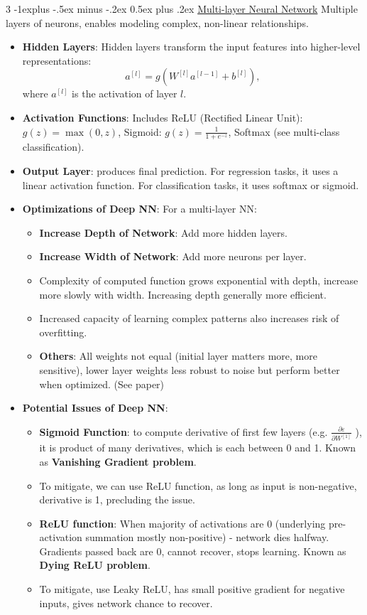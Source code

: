 \documentclass[a4paper, 9pt, landscape]{article}
\makeatletter
\renewcommand{\subsection}{\@startsection{subsection}{2}{0mm}%
                                {-1explus -.5ex minus -.2ex}%
                                {0.5ex plus .2ex}%
                                {\normalfont\normalsize\bfseries}}
\makeatother
\begin{document}
\begin{multicols*}{3}
\subsection{\underline{Multi-layer Neural Network}}
Multiple layers of neurons, enables modeling complex, non-linear relationships. 
\begin{itemize}
\item \textbf{Hidden Layers}: Hidden layers transform the input features into higher-level representations:
$$
a^{[l]} = g(W^{[l]} a^{[l-1]} + b^{[l]}),
$$
where $ a^{[l]} $ is the activation of layer $ l $.
\item \textbf{Activation Functions}: Includes ReLU (Rectified Linear Unit): $ g(z) = \max(0, z) $, Sigmoid: $ g(z) = \frac{1}{1 + e^{-z}} $, Softmax (see multi-class classification).
\item \textbf{Output Layer}: produces final prediction. For regression tasks, it uses a linear activation function. For classification tasks, it uses softmax or sigmoid.
\item \textbf{Optimizations of Deep NN}: For a multi-layer NN:
	\begin{itemize}
	\item \textbf{Increase Depth of Network}: Add more hidden layers.
	\item \textbf{Increase Width of Network}: Add more neurons per layer.
	\item Complexity of computed function grows exponential with depth, increase more slowly with width. Increasing depth generally more efficient.
	\item Increased capacity of learning complex patterns also increases risk of overfitting.
	\item \textbf{Others}: All weights not equal (initial layer matters more, more sensitive), lower layer weights less robust to noise but perform better when optimized. (See paper)
	\end{itemize}
\item \textbf{Potential Issues of Deep NN}: 
	\begin{itemize}
	\item \textbf{Sigmoid Function}: to compute derivative of first few layers (e.g. $\frac{\partial \varepsilon}{\partial W^{[1]}}$ ), it is product of many derivatives, which is each between 0 and 1. Known as \textbf{Vanishing Gradient problem}. 
	\item To mitigate, we can use ReLU function, as long as input is non-negative, derivative is 1, precluding the issue.
	\item \textbf{ReLU function}: When majority of activations are 0 (underlying pre-activation summation mostly non-positive) - network dies halfway. Gradients passed back are 0, cannot recover, stops learning. Known as \textbf{Dying ReLU problem}.
	\item To mitigate, use Leaky ReLU, has small positive gradient for negative inputs, gives network chance to recover.
	\end{itemize}
\end{itemize}


\end{multicols*}
\end{document}
